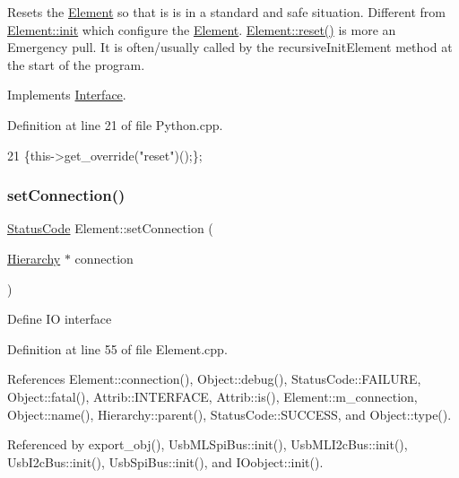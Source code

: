 Resets the \hyperlink{classElement}{Element} so that is is in a standard and safe situation. Different from \hyperlink{classElement_af42754b5cabc198869222725218d695c}{Element\+::init} which configure the \hyperlink{classElement}{Element}. \hyperlink{classElement_a69efffa22f06909d768149715565cb56}{Element\+::reset()} is more an Emergency pull. It is often/usually called by the recursive\+Init\+Element method at the start of the program. 

Implements \hyperlink{classInterface_a4d44329cea9981a9e0392eaaf99efadd}{Interface}.



Definition at line 21 of file Python.\+cpp.


\begin{DoxyCode}
21 \{this->get\_override(\textcolor{stringliteral}{"reset"})();\};
\end{DoxyCode}
\mbox{\label{classElement_ab476b4b1df5954141ceb14f072433b89}} 
\subsubsection{\texorpdfstring{set\+Connection()}{setConnection()}}
{\footnotesize\ttfamily \hyperlink{classStatusCode}{Status\+Code} Element\+::set\+Connection (\begin{DoxyParamCaption}\item[{\hyperlink{classHierarchy}{Hierarchy} $\ast$}]{connection }\end{DoxyParamCaption})\hspace{0.3cm}{\ttfamily [inherited]}}

Define IO interface 

Definition at line 55 of file Element.\+cpp.



References Element\+::connection(), Object\+::debug(), Status\+Code\+::\+F\+A\+I\+L\+U\+RE, Object\+::fatal(), Attrib\+::\+I\+N\+T\+E\+R\+F\+A\+CE, Attrib\+::is(), Element\+::m\+\_\+connection, Object\+::name(), Hierarchy\+::parent(), Status\+Code\+::\+S\+U\+C\+C\+E\+SS, and Object\+::type().



Referenced by export\+\_\+obj(), Usb\+M\+L\+Spi\+Bus\+::init(), Usb\+M\+L\+I2c\+Bus\+::init(), Usb\+I2c\+Bus\+::init(), Usb\+Spi\+Bus\+::init(), and I\+Oobject\+::init().


